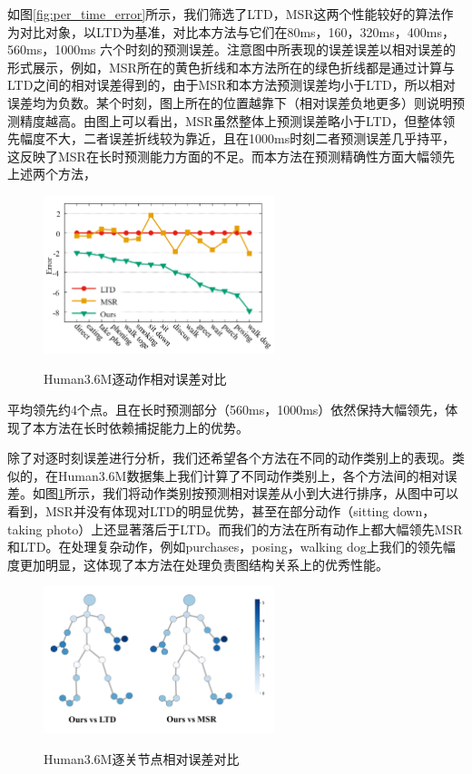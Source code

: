 如图\ref{fig:per_time_error}所示，我们筛选了LTD，MSR这两个性能较好的算法作为对比对象，以LTD为基准，对比本方法与它们在80ms，160，320ms，400ms，560ms，1000ms 六个时刻的预测误差。注意图中所表现的误差误差以相对误差的形式展示，例如，MSR所在的黄色折线和本方法所在的绿色折线都是通过计算与LTD之间的相对误差得到的，由于MSR和本方法预测误差均小于LTD，所以相对误差均为负数。某个时刻，图上所在的位置越靠下（相对误差负地更多）则说明预测精度越高。由图上可以看出，MSR虽然整体上预测误差略小于LTD，但整体领先幅度不大，二者误差折线较为靠近，且在1000ms时刻二者预测误差几乎持平，这反映了MSR在长时预测能力方面的不足。而本方法在预测精确性方面大幅领先上述两个方法，
\begin{figure}[h]
    \centering
    \includegraphics[width=0.60\textwidth]{FigMa/per_action.png}\\
    \vspace{-0.3cm}
    \caption{Human3.6M逐动作相对误差对比}
    \label{fig:per_action_error}
\end{figure}
平均领先约4个点。且在长时预测部分（560ms，1000ms）依然保持大幅领先，体现了本方法在长时依赖捕捉能力上的优势。


除了对逐时刻误差进行分析，我们还希望各个方法在不同的动作类别上的表现。类似的，在Human3.6M数据集上我们计算了不同动作类别上，各个方法间的相对误差。如图\ref{fig:per_action_error}所示，我们将动作类别按预测相对误差从小到大进行排序，从图中可以看到，MSR并没有体现对LTD的明显优势，甚至在部分动作（sitting down，taking photo）上还显著落后于LTD。而我们的方法在所有动作上都大幅领先MSR和LTD。在处理复杂动作，例如purchases，posing，walking dog上我们的领先幅度更加明显，这体现了本方法在处理负责图结构关系上的优秀性能。

\begin{figure}[ht]
    \centering
    \includegraphics[width=0.60\textwidth]{FigMa/per_joint.png}\\
    \vspace{-0.3cm}
    \caption{Human3.6M逐关节点相对误差对比}
    \label{fig:per_joint_error}
\end{figure}

